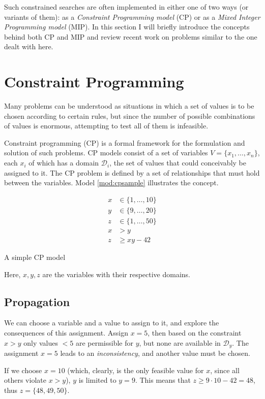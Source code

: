 \documentclass[13pt, letterpaper, oneside]{book}
\begin{document}
Such constrained searches are often implemented in either one of two ways (or
variants of them): as a \textit{Constraint Programming model} (CP) or as a
\textit{Mixed Integer Programming model} (MIP). In this section I will briefly
introduce the concepts behind both CP and MIP and review recent work on problems
similar to the one dealt with here.

\section{Constraint Programming}
\label{sec:backgroundcp}
Many problems can be understood as situations in which a set of values is to be
chosen according to certain rules, but since the number of possible combinations
of values is enormous, attempting to test all of them is infeasible.


Constraint programming (CP) is a formal framework for the formulation and
solution of such problems. CP models consist of a set of variables $V = \{x_1,
\dots, x_n\}$, each $x_i$ of which has a domain $\mathcal{D}_i$, the set of
values that could conceivably be assigned to it. The CP problem is defined by a
set of relationships that must hold between the variables. Model
\ref{mod:cpsample} illustrates the concept.

\begin{model}
\begin{align}
x &\in \{1,\dots,10\}\\
y &\in \{9,\dots,20\}\\
z &\in \{1,\dots,50\}\\
x &> y\\
z &\geq xy - 42
\end{align}
\caption{A simple CP model}
\label{mod:cpsample}
\end{model}
Here, $x, y, z$ are the variables with their respective domains.

\subsection{Propagation}
We can choose a variable and a value to assign to it, and explore the
consequences of this assignment. Assign $x = 5$, then based on the constraint $x
> y$ only values $< 5$ are permissible for $y$, but none are available in
$\mathcal{D}_y$. The assignment $x = 5$ leads to an \textit{inconsistency}, and
another value must be chosen.
 
If we choose $x = 10$ (which, clearly, is the only feasible value for $x$, since all
others violate $x > y$), $y$ is limited to $y = 9$. This means that $z \geq 9 \cdot
10 - 42 = 48$, thus $z = \{48, 49, 50\}$.
 
\end{document}
